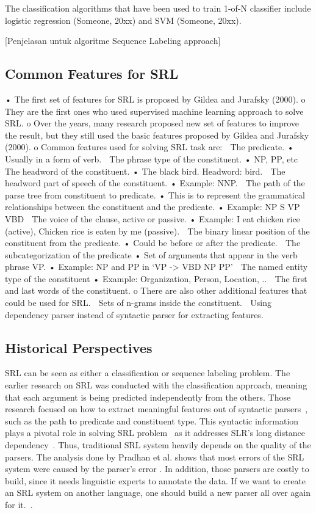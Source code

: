 The classification algorithms that have been used to train 1-of-N classifier include logistic regression (Someone, 20xx) and SVM (Someone, 20xx).

[Penjelasan untuk algoritme Sequence Labeling approach]

\subsection{Common Features for SRL}
•	The first set of features for SRL is proposed by Gildea and Jurafsky (2000).
o	They are the first ones who used supervised machine learning approach to solve SRL. 
o	Over the years, many research proposed new set of features to improve the result, but they still used the basic features proposed by Gildea and Jurafsky (2000).
o	Common features used for solving SRL task are:
	The predicate. 
•	Usually in a form of verb.
	The phrase type of the constituent.
•	NP, PP, etc
	The headword of the constituent.
•	The black bird. Headword: bird.
	The headword part of speech of the constituent. 
•	Example: NNP.
	The path of the parse tree from constituent to predicate. 
•	This is to represent the grammatical relationships between the constituent and the predicate.
•	Example: NP S VP VBD
	The voice of the clause, active or passive.
•	Example: I eat chicken rice (active), Chicken rice is eaten by me (passive).
	The binary linear position of the constituent from the predicate.
•	Could be before or after the predicate.
	The subcategorization of the predicate
•	Set of arguments that appear in the verb phrase VP.
•	Example: NP and PP in ‘VP -> VBD NP PP’
	The named entity type of the constituent
•	Example: Organization, Person, Location, ..
	The first and last words of the constituent.
o	There are also other additional features that could be used for SRL.
	Sets of n-grams inside the constituent.
	Using dependency parser instead of syntactic parser for extracting features.

\subsection{Historical Perspectives}
SRL can be seen as either a classification or sequence labeling problem. The earlier research on SRL was conducted with the classification approach, meaning that each argument is being predicted independently from the others. Those research focused on how to extract meaningful features out of syntactic parsers~\cite{gildea2002automatic, gildea2002necessity, pradhan2005semantic}, such as the path to predicate and constituent type. This syntactic information plays a pivotal role in solving SRL problem~\cite{punyakanok2008importance} as it addresses SLR's long distance dependency~\cite{zhou2015end}. Thus, traditional SRL system heavily depends on the quality of the parsers. The analysis done by Pradhan et al. shows that most errors of the SRL system were caused by the parser's error \cite{pradhan2005semantic}. In addition, those parsers are costly to build, since it needs linguistic experts to annotate the data. If we want to create an SRL system on another language, one should build a new parser all over again for it.~\cite{zhou2015end}.

